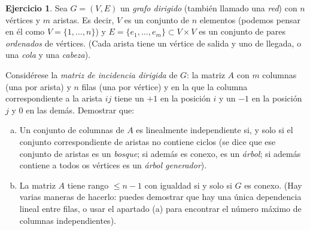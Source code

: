 \documentclass[10pt]{article}
\theoremstyle{definition}
\newtheorem{ejer}{Ejercicio}
\begin{document}
\begin{ejer} Sea $G=(V,E)$ un \textit{grafo dirigido} (también llamado una \textit{red}) con $n$ vértices y $m$ aristas. Es decir, $V$ es un conjunto de $n$ elementos (podemos pensar en él como $V=\{1,\ldots, n\}$) y $E=\{e_1,\ldots, e_m\}\subset V\times V$ es un conjunto de pares \textit{ordenados} de vértices. (Cada arista tiene un vértice de salida y uno de llegada, o una \textit{cola} y una \textit{cabeza}).

Considérese la \textit{matriz de incidencia dirigida} de $G$: la matriz $A$ con $m$ columnas (una por arista) y $n$ filas (una por vértice) y en la que la columna correspondiente a la arista $ij$ tiene un $+1$ en la posición $i$ y un $-1$ en la posición $j$ y $0$ en las demás. Demostrar que:

\begin{enumerate}[(a)]
\item Un conjunto de columnas de $A$ es linealmente independiente si, y solo si el conjunto correspondiente de aristas no contiene ciclos (se dice que ese conjunto de aristas es un \textit{bosque}; si además es conexo, es un \textit{árbol}; si además contiene a todos os vértices es un \textit{árbol generador}).
\item La matriz $A$ tiene rango $\leq n-1$ con igualdad si y solo si $G$ es conexo. (Hay varias maneras de hacerlo: puedes demostrar que hay una única dependencia lineal entre filas, o usar el apartado (a) para encontrar el número máximo de columnas independientes).
\end{enumerate}\end{ejer}
\end{document}
